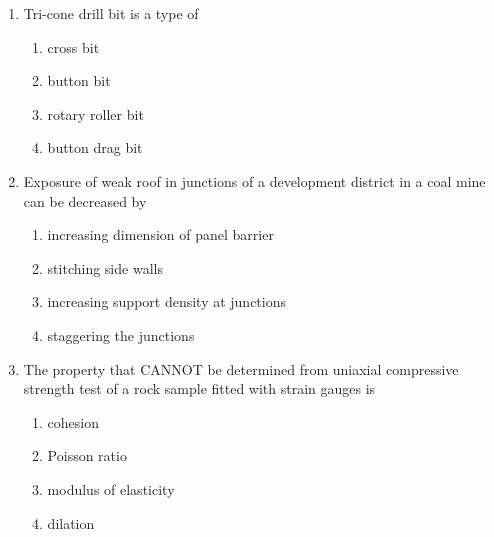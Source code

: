 \documentclass[journal,12pt,onecolumn]{IEEEtran}
\theoremstyle{remark}
\begin{document}
\begin{enumerate}
\hfill{}
\begin{multicols}{2}
\begin{enumerate}
  \item $W60^\circ N$
  \item $N30^\circ W$
  \item $S30^\circ W$
  \item $S30^\circ E$
\end{enumerate}
\end{multicols}

 \item Tri-cone drill bit is a type of
\hfill{}
\begin{multicols}{4}
\begin{enumerate}
\item cross bit 
\item button bit
\item rotary roller bit
\item button drag bit
\end{enumerate}
\end{multicols}

\item Exposure of weak roof in junctions of a development district in a coal mine can be decreased by

\hfill{}
\begin{multicols}{2}
\begin{enumerate}
\item increasing dimension of panel barrier
\item stitching side walls
\item increasing support density at junctions
\item staggering the junctions
\end{enumerate}
\end{multicols}

\item The property that CANNOT be determined from uniaxial compressive strength test of a rock sample fitted with strain gauges is

\hfill{}
\begin{multicols}{4}
\begin{enumerate}
\item cohesion
\item Poisson ratio
\item modulus of elasticity
\item dilation
\end{enumerate}
\end{multicols}


\end{enumerate}
\end{document}
